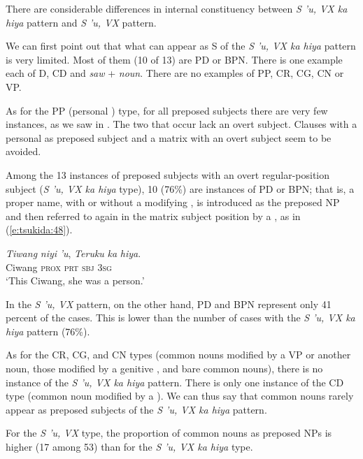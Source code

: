 \documentclass[output=paper
,modfonts
,nonflat]{langsci/langscibook}
\begin{document}
There are considerable differences in internal constituency between \textit{S 'u, VX ka hiya} pattern and \textit{S 'u, VX} pattern. 

We can first point out that what can appear as S of the \textit{S 'u, VX ka hiya} pattern is very limited. Most of them (10 of 13) are PD or BPN. There is one example each of D, CD and \textit{saw} + \textit{noun}. There are no examples of PP, CR, CG, CN or VP. 

As for the PP (personal ) type, for all preposed subjects there are very few instances, as we saw in . The two that occur lack an overt subject. Clauses with a personal  as preposed subject and a matrix  with an overt subject seem to be avoided. 

Among the 13 instances of preposed subjects with an overt regular-position subject (\textit{S 'u, VX ka hiya} type), 10 (76\%) are instances of PD or BPN; that is, a proper name, with or without a modifying , is introduced as the preposed NP and then referred to again in the matrix subject position by a , as in (\ref{e:tsukida:48}).

\begin{exe}
	\ex\label{e:tsukida:48} 
	\gll \textit{Tiwang}  \textit{niyi}  \textit{'u},  \textit{Teruku}   \textit{ka}   \textit{hiya}.\\
	Ciwang  \textsc{prox}  \textsc{prt}  \textsc{sbj}  \textsc{3sg}\\
	\glt ‘This Ciwang, she was a  person.’
\end{exe}

\noindent
In the \textit{S 'u, VX} pattern, on the other hand, PD and BPN represent only 41 percent of the cases. This is lower than the number of cases with the \textit{S 'u, VX ka hiya} pattern (76\%). 

As for the CR, CG, and CN types (common nouns modified by a VP or another noun, those modified by a genitive , and bare common nouns), there is no instance of the \textit{S 'u, VX ka hiya} pattern. There is only one instance of the CD type (common noun modified by a ). We can thus say that common nouns rarely appear as preposed subjects of the \textit{S 'u, VX ka hiya} pattern. 

For the \textit{S 'u, VX} type, the proportion of common nouns as preposed NPs is higher (17 among 53) than for the \textit{S 'u, VX ka hiya} type. 
\end{document}
